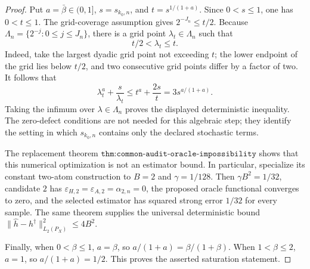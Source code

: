 \begin{proof}
Put \(a=\bar\beta\in(0,1]\), \(s=s_{k_0,n}\), and \(t=s^{1/(1+a)}\). Since \(0<s\le1\), one has \(0<t\le1\). The grid-coverage assumption gives \(2^{-J_n}\le t/2\). Because \(\Lambda_n=\{2^{-j}:0\le j\le J_n\}\), there is a grid point \(\lambda_t\in\Lambda_n\) such that
\[
 t/2<\lambda_t\le t.
\]
Indeed, take the largest dyadic grid point not exceeding \(t\); the lower endpoint of the grid lies below \(t/2\), and two consecutive grid points differ by a factor of two. It follows that
\[
 \lambda_t^a+\frac{s}{\lambda_t}
 \le t^a+\frac{2s}{t}
 =3s^{a/(1+a)}.
\]
Taking the infimum over \(\lambda\in\Lambda_n\) proves the displayed deterministic inequality. The zero-defect conditions are not needed for this algebraic step; they identify the setting in which \(s_{k_0,n}\) contains only the declared stochastic terms.

The replacement theorem \(\texttt{thm:common-audit-oracle-impossibility}\) shows that this numerical optimization is not an estimator bound. In particular, specialize its constant two-atom construction to \(B=2\) and \(\gamma=1/128\). Then \(\gamma B^2=1/32\), candidate \(2\) has \(\varepsilon_{H,2}=\varepsilon_{A,2}=\alpha_{2,n}=0\), the proposed oracle functional converges to zero, and the selected estimator has squared strong error \(1/32\) for every sample. The same theorem supplies the universal deterministic bound \(\|\widehat h-h^\dagger\|_{L_2(P_X)}^2\le4B^2\).

Finally, when \(0<\beta\le1\), \(a=\beta\), so \(a/(1+a)=\beta/(1+\beta)\). When \(1<\beta\le2\), \(a=1\), so \(a/(1+a)=1/2\). This proves the asserted saturation statement.
\end{proof}
